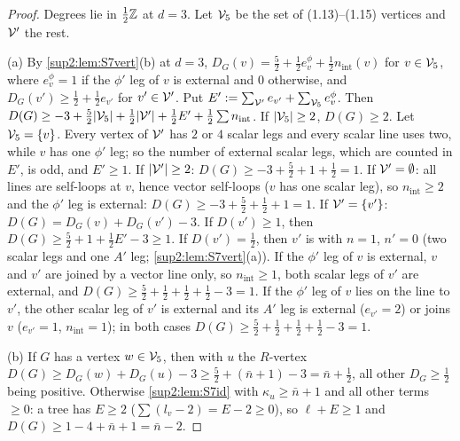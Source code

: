 \begin{proof}
Degrees lie in $\frac12\mathbb Z$ at $d=3$. Let $\mathcal V_5$ be the set of (1.13)--(1.15) vertices and $\mathcal V'$ the rest.

(a) By \cref{sup2:lem:S7vert}(b) at $d=3$, $D_G(v)=\frac52+\frac12e^\phi_v+\frac12n_{\mathrm{int}}(v)$ for $v\in\mathcal V_5$, where $e^\phi_v=1$ if the $\phi'$ leg of $v$ is external and $0$ otherwise, and $D_G(v')\ge\frac12+\frac12e_{v'}$ for $v'\in\mathcal V'$. Put $E':=\sum_{\mathcal V'}e_{v'}+\sum_{\mathcal V_5}e^\phi_v$. Then $D(G)\ge-3+\frac52|\mathcal V_5|+\frac12|\mathcal V'|+\frac12E'+\frac12\sum n_{\mathrm{int}}$. If $|\mathcal V_5|\ge2$, $D(G)\ge2$. Let $\mathcal V_5=\{v\}$. Every vertex of $\mathcal V'$ has $2$ or $4$ scalar legs and every scalar line uses two, while $v$ has one $\phi'$ leg; so the number of external scalar legs, which are counted in $E'$, is odd, and $E'\ge1$. If $|\mathcal V'|\ge2$: $D(G)\ge-3+\frac52+1+\frac12=1$. If $\mathcal V'=\emptyset$: all lines are self-loops at $v$, hence vector self-loops ($v$ has one scalar leg), so $n_{\mathrm{int}}\ge2$ and the $\phi'$ leg is external: $D(G)\ge-3+\frac52+\frac12+1=1$. If $\mathcal V'=\{v'\}$: $D(G)=D_G(v)+D_G(v')-3$. If $D(v')\ge1$, then $D(G)\ge\frac52+1+\frac12E'-3\ge1$. If $D(v')=\frac12$, then $v'$ is \cite[(1.8)]{Ba3} with $n=1$, $n'=0$ (two scalar legs and one $A'$ leg; \cref{sup2:lem:S7vert}(a)). If the $\phi'$ leg of $v$ is external, $v$ and $v'$ are joined by a vector line only, so $n_{\mathrm{int}}\ge1$, both scalar legs of $v'$ are external, and $D(G)\ge\frac52+\frac12+\frac12+\frac12-3=1$. If the $\phi'$ leg of $v$ lies on the line to $v'$, the other scalar leg of $v'$ is external and its $A'$ leg is external ($e_{v'}=2$) or joins $v$ ($e_{v'}=1$, $n_{\mathrm{int}}=1$); in both cases $D(G)\ge\frac52+\frac12+\frac12+\frac12-3=1$.

(b) If $G$ has a vertex $w\in\mathcal V_5$, then with $u$ the $R$-vertex $D(G)\ge D_G(w)+D_G(u)-3\ge\frac52+(\bar n+1)-3=\bar n+\frac12$, all other $D_G\ge\frac12$ being positive. Otherwise \cref{sup2:lem:S7id} with $\kappa_u\ge\bar n+1$ and all other terms $\ge0$: a tree has $E\ge2$ ($\sum(l_v-2)=E-2\ge0$), so $\ell+E\ge1$ and $D(G)\ge1-4+\bar n+1=\bar n-2$.


\end{proof}

